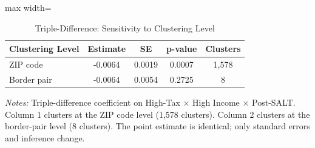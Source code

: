 \begin{table}[htbp]
\centering
\caption{Triple-Difference: Sensitivity to Clustering Level}
\label{tab:ddd_cluster}
\begin{adjustbox}{max width=\textwidth}
\begin{tabular}{lcccc}
  \hline
Clustering Level & Estimate & SE & p-value & Clusters \\ 
  \hline
ZIP code & -0.0064 & 0.0019 & 0.0007 & 1,578 \\ 
  Border pair & -0.0064 & 0.0054 & 0.2725 &     8 \\ 
   \hline
\end{tabular}
\end{adjustbox}
\begin{tablenotes}\small
\item \textit{Notes:} Triple-difference coefficient on High-Tax $\times$ High Income $\times$ Post-SALT. Column 1 clusters at the ZIP code level (1,578 clusters). Column 2 clusters at the border-pair level (8 clusters). The point estimate is identical; only standard errors and inference change.
\end{tablenotes}
\end{table}

